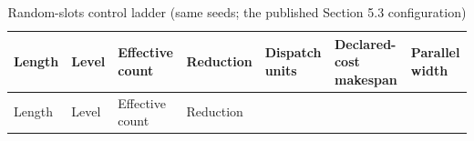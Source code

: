 \documentclass[
  11pt,
]{article}
\begin{document}
\begin{longtable}[]{@{}
  >{\raggedright\arraybackslash}p{}
  >{\raggedright\arraybackslash}p{}
  >{\raggedright\arraybackslash}p{}
  >{\raggedright\arraybackslash}p{}
  >{\raggedright\arraybackslash}p{}
  >{\raggedright\arraybackslash}p{}
  >{\raggedright\arraybackslash}p{}@{}}
\caption{Random-slots control ladder (same seeds; the published Section
5.3 configuration)}\tabularnewline
\toprule\noalign{}
\begin{minipage}[b]{\linewidth}\raggedright
Length
\end{minipage} & \begin{minipage}[b]{\linewidth}\raggedright
Level
\end{minipage} & \begin{minipage}[b]{\linewidth}\raggedright
Effective count
\end{minipage} & \begin{minipage}[b]{\linewidth}\raggedright
Reduction
\end{minipage} & \begin{minipage}[b]{\linewidth}\raggedright
Dispatch units
\end{minipage} & \begin{minipage}[b]{\linewidth}\raggedright
Declared-cost makespan
\end{minipage} & \begin{minipage}[b]{\linewidth}\raggedright
Parallel width
\end{minipage} \\
\midrule\noalign{}
\endfirsthead
\toprule\noalign{}
\begin{minipage}[b]{\linewidth}\raggedright
Length
\end{minipage} & \begin{minipage}[b]{\linewidth}\raggedright
Level
\end{minipage} & \begin{minipage}[b]{\linewidth}\raggedright
Effective count
\end{minipage} & \begin{minipage}[b]{\linewidth}\raggedright
Reduction
\end{minipage} & \begin{minipage}[b]{\linewidth}\raggedright

\end{minipage}
\end{longtable}
\end{document}
